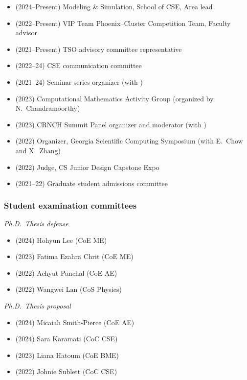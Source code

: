 \begin{itemize}
    \item (2024--Present) Modeling \& Simulation, School of CSE, Area lead
    \item (2022--Present) VIP Team Phoenix--Cluster Competition Team, Faculty advisor
    \item (2021--Present) TSO advisory committee representative
    \item (2022--24) CSE communication committee
    \item (2021--24) Seminar series organizer (with \Florian)
    \item (2023) Computational Mathematics Activity Group (organized by N.\ Chandramoorthy)
    \item (2023) CRNCH Summit Panel organizer and moderator (with \Rich)
    \item (2022) Organizer, Georgia Scientific Computing Symposium (with E.\ Chow and X.\ Zhang)
    \item (2022) Judge, CS Junior Design Capstone Expo
    \item (2021--22) Graduate student admissions committee
\end{itemize}

\subsubsection{Student examination committees}

\textit{Ph.D.\ Thesis defense}
\vspace{-0.25cm}
\begin{multicols}{2}
\begin{itemize}
    \item (2024)  Hohyun Lee (CoE ME)
    \item (2023)  Fatima Ezahra Chrit (CoE ME)
    \item (2022)  Achyut Panchal (CoE AE)
    \item (2022)  Wangwei Lan (CoS Physics)
\end{itemize}
\end{multicols}

\textit{Ph.D.\ Thesis proposal}
\vspace{-0.25cm}
\begin{multicols}{2}
\begin{itemize}
    \item (2024)  Micaiah Smith-Pierce (CoE AE)
    \item (2024)  Sara Karamati (CoC CSE)
    \item (2023)  Liana Hatoum (CoE BME)
    \item (2022)  Johnie Sublett (CoC CSE)
\end{itemize}
\end{multicols}

